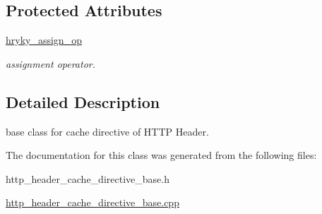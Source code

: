 \subsection*{Protected Attributes}
\begin{DoxyCompactItemize}
\item 
\hypertarget{classhryky_1_1http_1_1header_1_1cache_1_1directive_1_1_base_a8f960712519a9311954268c3d5dc78f1}{\hyperlink{classhryky_1_1http_1_1header_1_1cache_1_1directive_1_1_base_a8f960712519a9311954268c3d5dc78f1}{hryky\-\_\-assign\-\_\-op}}\label{classhryky_1_1http_1_1header_1_1cache_1_1directive_1_1_base_a8f960712519a9311954268c3d5dc78f1}

\begin{DoxyCompactList}\small\item\em assignment operator. \end{DoxyCompactList}\end{DoxyCompactItemize}


\subsection{Detailed Description}
base class for cache directive of H\-T\-T\-P Header. 

The documentation for this class was generated from the following files\-:\begin{DoxyCompactItemize}
\item 
http\-\_\-header\-\_\-cache\-\_\-directive\-\_\-base.\-h\item 
\hyperlink{http__header__cache__directive__base_8cpp}{http\-\_\-header\-\_\-cache\-\_\-directive\-\_\-base.\-cpp}\end{DoxyCompactItemize}
